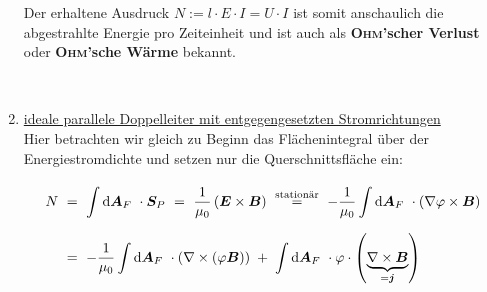 \begin{enumerate}[label=\roman*]
Der erhaltene Ausdruck $N := l \cdot E \cdot I = U \cdot I$ ist somit anschaulich die abgestrahlte Energie pro Zeiteinheit und ist auch als \textbf{\textsc{Ohm}'scher Verlust} oder \textbf{\textsc{Ohm}'sche Wärme} bekannt.

\ \\

\item \underline{ideale parallele Doppelleiter mit entgegengesetzten Stromrichtungen}
\ \\

Hier betrachten wir gleich zu Beginn das Flächenintegral über der Energiestromdichte und setzen nur die Querschnittsfläche ein:

\begin{align*}
N \ &= \ \int\limits_{{}}^{{}}\mathrm{d}{\bm{A}_F}\  \cdot \bm{S}_P \ = \ \frac{1}{\mu_0} \left(\bm{E}\times\bm{B}\right) \ \overset{\text{stationär}}{=} \ - \frac{1}{\mu_0} \int\limits_{{}}^{{}}\mathrm{d}{\bm{A}_F}\  \cdot \left(\nabla \varphi \times \bm{B}\right)\\
&= \ - \frac{1}{\mu_0} \int\limits_{{}}^{{}}\mathrm{d}{\bm{A}_F}\  \cdot \left(\nabla\times\left(\varphi\bm{B}\right)\right) \; + \; \int\limits_{{}}^{{}}\mathrm{d}{\bm{A}_F}\ \cdot\varphi\cdot\left(\underbrace{\nabla\times\bm{B}}_{=\bm{j}}\right)
\end{align*}



\end{enumerate}